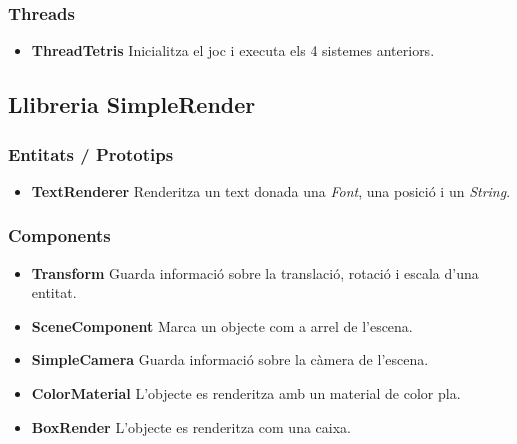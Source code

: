     \subsubsection{Threads}
    
      \begin{itemize}
        \item {\bf ThreadTetris}
          Inicialitza el joc i executa els 4 sistemes anteriors.
          
      \end{itemize}
    
  \subsection{Llibreria SimpleRender}

    \subsubsection{Entitats / Prototips}

      \begin{itemize}
        \item {\bf TextRenderer}
          Renderitza un text donada una {\em Font}, una posició i un {\em String}.
      \end{itemize}


    \subsubsection{Components}

      \begin{itemize}
        \item {\bf Transform}
          Guarda informació sobre la translació, rotació i escala d'una entitat.
          
        \item {\bf SceneComponent}
          Marca un objecte com a arrel de l'escena.
          
        \item {\bf SimpleCamera}
          Guarda informació sobre la càmera de l'escena.
          
        \item {\bf ColorMaterial}
          L'objecte es renderitza amb un material de color pla.
          
        \item {\bf BoxRender}
          L'objecte es renderitza com una caixa.
          
      \end{itemize}
      
